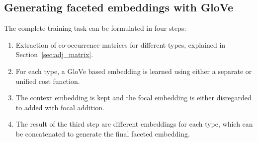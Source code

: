 \subsection{Generating faceted embeddings with GloVe}
The complete training task can be formulated in four steps: 
 \begin{enumerate}        
 \item Extraction of co-occurrence matrices for different types, explained in Section~\ref{sec:adj_matrix}. 
 \item For each type, a GloVe based embedding is learned using either a separate or unified cost function. 
 \item The context embedding is kept and the focal embedding is either disregarded to added with focal addition.
 \item The result of the third step are different embeddings for each type, which can be concatenated to generate the final faceted embedding. 
 \end{enumerate}
 
